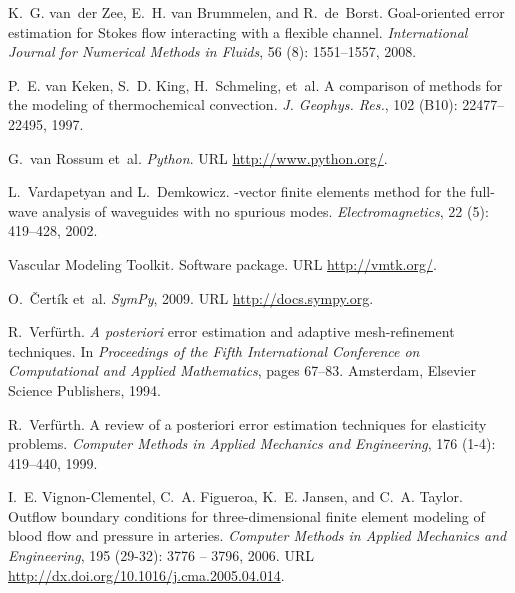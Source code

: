 \begin{thebibliography}{467}
K.~G. van~der Zee, E.~H. van Brummelen, and R.~de~Borst.
\newblock Goal-oriented error estimation for {S}tokes flow interacting with a
  flexible channel.
\newblock \emph{International Journal for Numerical Methods in Fluids},
  56 (8): 1551--1557, 2008.

P.~E. van Keken, S.~D. King, H.~Schmeling, et~al.
\newblock A comparison of methods for the modeling of thermochemical
  convection.
\newblock \emph{J. Geophys. Res.}, 102 (B10): 22477--22495,
  1997.

G.~van Rossum et~al.
\newblock \emph{Python}.
\newblock URL \url{http://www.python.org/}.

L.~Vardapetyan and L.~Demkowicz.
-vector finite elements method for the full-wave analysis of
  waveguides with no spurious modes.
\newblock \emph{Electromagnetics}, 22 (5): 419--428, 2002.

{Vascular Modeling Toolkit}.
\newblock Software package.
\newblock URL \url{http://vmtk.org/}.

O.~\v{C}ert\'{i}k et~al.
\newblock \emph{{SymPy}}, 2009.
\newblock URL \url{http://docs.sympy.org}.

R.~Verf{\"u}rth.
\newblock \emph{A posteriori} error estimation and adaptive mesh-refinement
  techniques.
\newblock In \emph{Proceedings of the Fifth International Conference on
  Computational and Applied Mathematics}, pages 67--83. Amsterdam, Elsevier
  Science Publishers, 1994.

R.~Verf{\"u}rth.
\newblock A review of a posteriori error estimation techniques for elasticity
  problems.
\newblock \emph{Computer Methods in Applied Mechanics and Engineering},
  176 (1-4): 419--440, 1999.

I.~E. Vignon-Clementel, C.~A. Figueroa, K.~E. Jansen, and C.~A. Taylor.
\newblock Outflow boundary conditions for three-dimensional finite element
  modeling of blood flow and pressure in arteries.
\newblock \emph{Computer Methods in Applied Mechanics and Engineering},
  195 (29-32): 3776 -- 3796, 2006.
\newblock URL \url{http://dx.doi.org/10.1016/j.cma.2005.04.014}.


\end{thebibliography}
